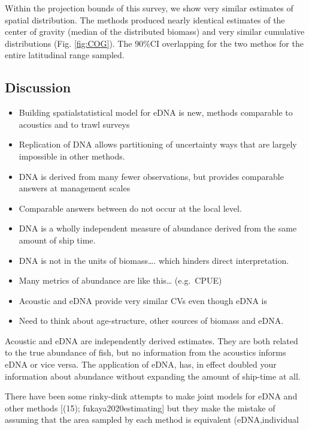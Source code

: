 \documentclass[
]{article}
\begin{document}
Within the projection bounds of this survey, we show very similar
estimates of spatial distribution. The methods produced nearly identical
estimates of the center of gravity (median of the distributed biomass)
and very similar cumulative distributions (Fig. \ref{fig:COG}). The
\(90\%\)CI overlapping for the two methos for the entire latitudinal
range sampled.

\clearpage

\hypertarget{discussion}{%
\subsection{Discussion}\label{discussion}}

\begin{itemize}
\item
  Building spatialstatistical model for eDNA is new, methods comparable
  to acoustics and to trawl surveys
\item
  Replication of DNA allows partitioning of uncertainty ways that are
  largely impossible in other methods.
\item
  DNA is derived from many fewer observations, but provides comparable
  answers at management scales
\item
  Comparable answers between do not occur at the local level.
\item
  DNA is a wholly independent measure of abundance derived from the same
  amount of ship time.
\item
  DNA is not in the units of biomass\ldots. which hinders direct
  interpretation.
\item
  Many metrics of abundance are like this\ldots{} (e.g.~CPUE)
\item
  Acoustic and eDNA provide very similar CVs even though eDNA is
\item
  Need to think about age-structure, other sources of biomass and eDNA.
\end{itemize}

Acoustic and eDNA are independently derived estimates. They are both
related to the true abundance of fish, but no information from the
acoustics informs eDNA or vice versa. The application of eDNA, has, in
effect doubled your information about abundance without expanding the
amount of ship-time at all.

There have been some rinky-dink attempts to make joint models for eDNA
and other methods {[}(15); fukaya2020estimating{]} but they make the
mistake of assuming that the area sampled by each method is equivalent
(eDNA,individual
\end{document}
